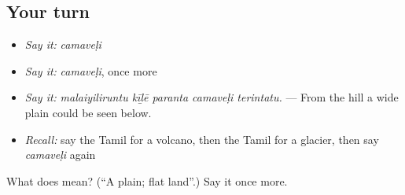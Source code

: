 \subsection*{Your turn}
\begin{itemize}
\raggedright
  \item \emph{Say it:} \emph{camaveḷi}
  \item \emph{Say it:} \emph{camaveḷi}, once more
  \item \emph{Say it:} \emph{malaiyiliruntu kīḻē paranta camaveḷi terintatu.} — From the hill a wide plain could be seen below.
  \item \emph{Recall:} say the Tamil for a volcano, then the Tamil for a glacier, then say \emph{camaveḷi} again
\end{itemize}

\begin{tcolorbox}[breakable,colback=teal!4,colframe=teal!35!black,title={Before you move on}]
What does  mean? (\textquotedblleft{}A plain; flat land\textquotedblright{}.) Say it once more.
\end{tcolorbox}
